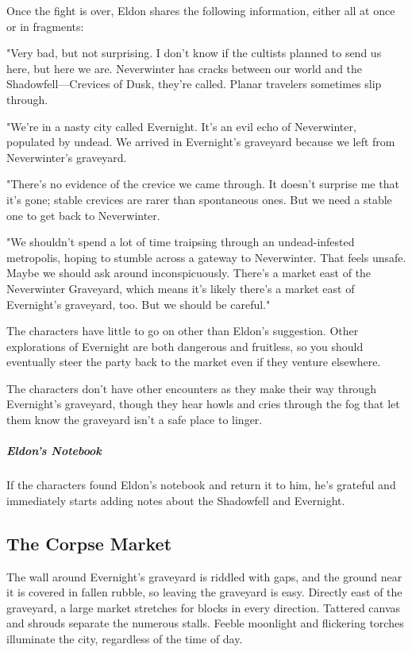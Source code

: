 \documentclass[10pt,a4paper,twoside,bg=print,twocolumn,openany,nodeprecatedcode]{dndbook}
\begin{document}
Once the fight is over, Eldon shares the following information, either all at once or in fragments:

\begin{DndReadAloud}{}
"Very bad, but not surprising. I don't know if the cultists planned to send us here, but here we are. Neverwinter has cracks between our world and the Shadowfell—Crevices of Dusk, they're called. Planar travelers sometimes slip through.

"We're in a nasty city called Evernight. It's an evil echo of Neverwinter, populated by undead. We arrived in Evernight's graveyard because we left from Neverwinter's graveyard.

"There's no evidence of the crevice we came through. It doesn't surprise me that it's gone; stable crevices are rarer than spontaneous ones. But we need a stable one to get back to Neverwinter.

"We shouldn't spend a lot of time traipsing through an undead-infested metropolis, hoping to stumble across a gateway to Neverwinter. That feels unsafe. Maybe we should ask around inconspicuously. There's a market east of the Neverwinter Graveyard, which means it's likely there's a market east of Evernight's graveyard, too. But we should be careful."

\end{DndReadAloud}

The characters have little to go on other than Eldon's suggestion. Other explorations of Evernight are both dangerous and fruitless, so you should eventually steer the party back to the market even if they venture elsewhere.

The characters don't have other encounters as they make their way through Evernight's graveyard, though they hear howls and cries through the fog that let them know the graveyard isn't a safe place to linger.

\subparagraph{Eldon's Notebook}
If the characters found Eldon's notebook and return it to him, he's grateful and immediately starts adding notes about the Shadowfell and Evernight.

\subsection{The Corpse Market}
\begin{DndReadAloud}{}
The wall around Evernight's graveyard is riddled with gaps, and the ground near it is covered in fallen rubble, so leaving the graveyard is easy. Directly east of the graveyard, a large market stretches for blocks in every direction. Tattered canvas and shrouds separate the numerous stalls. Feeble moonlight and flickering torches illuminate the city, regardless of the time of day.

\end{DndReadAloud}
\end{document}
